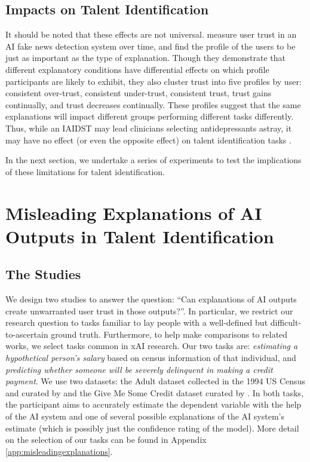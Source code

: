 \subsection{Impacts on Talent Identification}
It should be noted that these effects are not universal. \textcite{mohseni_trust_nodate} measure user trust in an AI fake news detection system over time, and find the profile of the users to be just as important as the type of explanation. Though they demonstrate that different explanatory conditions have differential effects on which profile participants are likely to exhibit, they also cluster trust into five profiles by user: consistent over-trust, consistent under-trust, consistent trust, trust gains continually, and trust decreases continually. These profiles suggest that the same explanations will impact different groups performing different tasks differently. Thus, while an IAIDST may lead clinicians selecting antidepressants astray, it may have no effect (or even the opposite effect) on talent identification tasks \cite{mohseni_trust_nodate}.

In the next section, we undertake a series of experiments to test the implications of these limitations for talent identification.

\section{Misleading Explanations of AI Outputs in Talent Identification}
\subsection{The Studies}
We design two studies to answer the question: ``Can explanations of AI outputs create unwarranted user trust in those outputs?''. In particular, we restrict our research question to tasks familiar to lay people with a well-defined but difficult-to-ascertain ground truth. Furthermore, to help make comparisons to related works, we select tasks common in xAI research. Our two tasks are: \emph{estimating a hypothetical person's salary} based on census information of that individual, and \emph{predicting whether someone will be severely delinquent in making a credit payment}. We use two datasets: the Adult dataset collected in the 1994 US Census and curated by \textcite{kohavi_scaling_1996} and the Give Me Some Credit dataset curated by \textcite{GiveMeSomeCredit}. In both tasks, the participant aims to accurately estimate the dependent variable with the help of the AI system and one of several possible explanations of the AI system's estimate (which is possibly just the confidence rating of the model). More detail on the selection of our tasks can be found in Appendix \ref{app:misleadingexplanations}.

